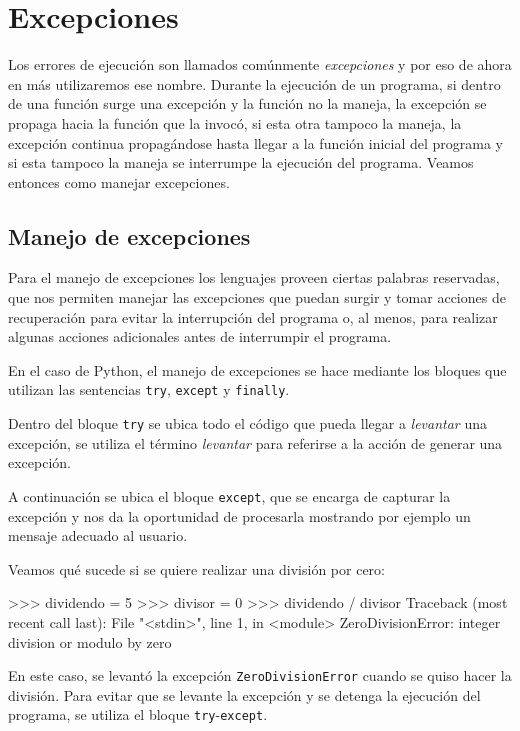 \section{Excepciones}

Los errores de ejecución son llamados comúnmente {\it excepciones} y por eso
de ahora en más utilizaremos ese nombre. Durante la ejecución de un programa,
si dentro de una función surge una excepción y la función no la maneja, la
excepción se propaga hacia la función que la invocó, si esta otra tampoco la
maneja, la excepción continua propagándose hasta llegar a la función inicial
del programa y si esta tampoco la maneja se interrumpe la ejecución del
programa. Veamos entonces como manejar excepciones.

\subsection{Manejo de excepciones}

Para el manejo de excepciones los lenguajes proveen ciertas palabras
reservadas, que nos permiten manejar las excepciones que puedan surgir y
tomar acciones de recuperación para evitar la interrupción del programa o,
al menos, para realizar algunas acciones adicionales antes de interrumpir
el programa.

En el caso de Python, el manejo de excepciones se hace mediante los
bloques que utilizan las sentencias \lstinline!try!, \lstinline!except! y
\lstinline!finally!.

Dentro del bloque \lstinline!try! se ubica todo el código que pueda llegar
a {\it levantar} una excepción, se utiliza el término {\it levantar} para
referirse a la acción de generar una excepción.

A continuación se ubica el bloque \lstinline!except!, que se encarga de
capturar la excepción y nos da la oportunidad de procesarla mostrando por
ejemplo un mensaje adecuado al usuario.

Veamos qué sucede si se quiere realizar una división por cero:

\begin{codigo-python-sn}
>>> dividendo = 5
>>> divisor = 0
>>> dividendo / divisor
Traceback (most recent call last):
  File "<stdin>", line 1, in <module>
ZeroDivisionError: integer division or modulo by zero
\end{codigo-python-sn}

En este caso, se levantó la excepción \lstinline!ZeroDivisionError! cuando se
quiso hacer la división.  Para evitar que se levante la excepción y se detenga
la ejecución del programa, se utiliza el bloque
\lstinline!try!-\lstinline!except!.

